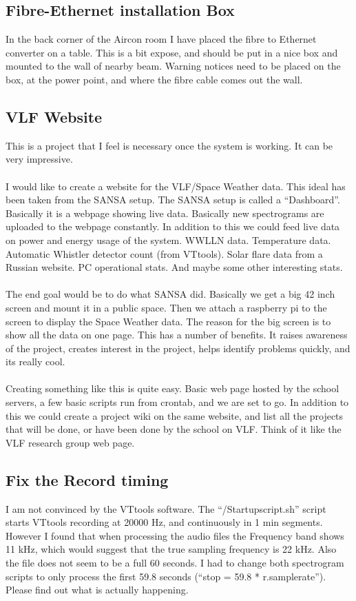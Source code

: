 \documentclass[a4paper,12pt]{article}
\begin{document}
\subsection{Fibre-Ethernet installation Box}

In the back corner of the Aircon room I have placed the fibre to Ethernet converter on a table. This is a bit expose, and should be put in a nice box and mounted to the wall of nearby beam. Warning notices need to be placed on the box, at the power point, and where the fibre cable comes out the wall.

\subsection{VLF Website}

This is a project that I feel is necessary once the system is working. It can be very impressive.\\
\\
I would like to create a website for the VLF/Space Weather data. This ideal has been taken from the SANSA setup. The SANSA setup is called a ``Dashboard''. Basically it is a webpage showing live data. Basically new spectrograms are uploaded to the webpage constantly. In addition to this we could feed live data on power and energy usage of the system. WWLLN data. Temperature data. Automatic Whistler detector count (from VTtools). Solar flare data from a Russian website. PC operational stats. And maybe some other interesting stats. \\
\\
The end goal would be to do what SANSA did. Basically we get a big 42 inch screen and mount it in a public space. Then we attach a raspberry pi to the screen to display the Space Weather data. The reason for the big screen is to show all the data on one page. This has a number of benefits. It raises awareness of the project, creates interest in the project, helps identify problems quickly, and its really cool.\\
\\
Creating something like this is quite easy. Basic web page hosted by the school servers, a few basic scripts run from crontab, and we are set to go. In addition to this we could create a project wiki on the same website, and list all the projects that will be done, or have been done by the school on VLF. Think of it like the VLF research group web page.

\subsection{Fix the Record timing}
I am not convinced by the VTtools software. The ``/Startupscript.sh'' script starts VTtools recording at 20000 Hz, and continuously in 1 min segments. However I found that when processing the audio files the Frequency band shows 11 kHz, which would suggest that the true sampling frequency is 22 kHz. Also the file does not seem to be a full 60 seconds. I had to change both spectrogram scripts to only process the first 59.8 seconds (``stop = 59.8 * r.samplerate''). Please find out what is actually happening.
\end{document}

